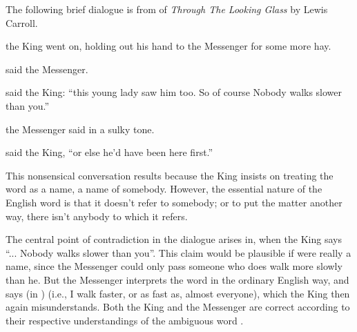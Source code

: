 The following brief dialogue is from  of \textit{Through The Looking
    Glass} by Lewis Carroll.
\begin{example}
 the King went on,\n
holding out his hand to the Messenger for some more\n
hay.
\end{example}

\begin{example}
 said the Messenger.
\end{example}

\begin{example}
 said the King:  ``this young lady saw\n
him too.  So of course Nobody walks slower than you.''
\end{example}

\begin{example}
 the Messenger said in a sulky tone.\n
{}
\end{example}

\begin{example}
 said the King, ``or else\n
he'd have been here first.''
\end{example}

This nonsensical conversation results because the King
    insists on treating the word  as a name, a name of
    somebody. However, the essential nature of the English word
     is that it doesn't refer to somebody; or to put the
    matter another way, there isn't anybody to which it refers.

The central point of contradiction in the dialogue arises in, when the King says ``...
    Nobody walks slower than you''. This claim would be plausible
    if  were really a name, since the Messenger could
    only pass someone who does walk more slowly than he. But the
    Messenger interprets the word  in the ordinary
    English way, and says (in )
     (i.e., I walk
    faster, or as fast as, almost everyone), which the King then
    again misunderstands. Both the King and the Messenger are
    correct according to their respective understandings of the
    ambiguous word .

